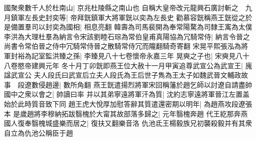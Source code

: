 國聚衆數千人於杜南山|{
	京兆杜陵縣之南山也}
自稱大皇帝改元龍興石廣討斬之　九月鎮軍左長史封奕等|{
	帝拜皝鎮軍大將軍皝以奕為左長史}
勸慕容皝稱燕王皝從之於是備置羣司以封奕為國相|{
	相息亮翻}
韓壽為司馬裴開為奉常陽騖為司隸王㝢為太僕李洪為大理杜羣為納言令宋該劉睦石琮為常伯皇甫真陽協為冗騎常侍|{
	納言令晉之尚書令常伯晉之侍中冗騎常侍晉之散騎常侍冗而隴翻騎奇寄翻}
宋晃平熙張泓為將軍封裕為記室監洪臻之孫|{
	李臻見八十七卷懷帝永嘉三年}
晃奭之子也|{
	宋奭見八十八卷愍帝建興元年}
冬十月丁卯皝即燕王位大赦十一月甲寅追尊武宣公為武宣王|{
	廆諡武宣公}
夫人段氏曰武宣后立夫人段氏為王后世子雋為王太子如魏武晉文輔政故事　段遼數侵趙邊|{
	數所角翻}
燕王皝遣揚烈將軍宋回稱藩於趙乞師以討遼自請盡帥國中之衆以會之|{
	帥讀曰率}
并以其弟寧遠將軍汗為質|{
	沈約志寧遠將軍晉江左置盖始於此時質音致下同}
趙王虎大悅厚加慰答辭其質遣還密期以明年|{
	為趙燕攻段遼張本}
是歲趙將李穆納拓跋翳槐於大甯其故部落多歸之|{
	元年翳槐奔趙}
代王紇那奔燕國人復奉翳槐城盛樂而居之|{
	復扶又翻樂音洛}
仇池氐王楊毅族兄初襲殺毅并有其衆自立為仇池公稱臣于趙

